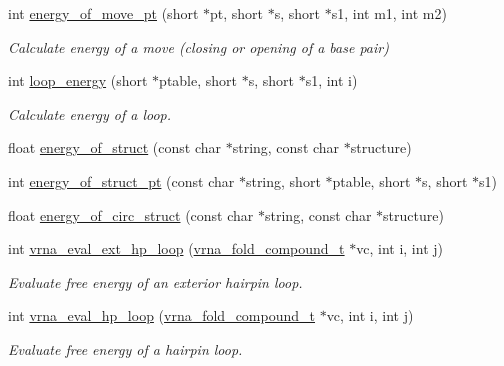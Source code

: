 \begin{DoxyCompactItemize}
int \hyperlink{group__eval_ga49e0ee561be69faf0568213546f6a53f}{energy\-\_\-of\-\_\-move\-\_\-pt} (short $\ast$pt, short $\ast$s, short $\ast$s1, int m1, int m2)
\begin{DoxyCompactList}\small\item\em Calculate energy of a move (closing or opening of a base pair) \end{DoxyCompactList}\item 
int \hyperlink{group__eval_ga507d4fd93f4b398d793ba2402731388d}{loop\-\_\-energy} (short $\ast$ptable, short $\ast$s, short $\ast$s1, int i)
\begin{DoxyCompactList}\small\item\em Calculate energy of a loop. \end{DoxyCompactList}\item 
float \hyperlink{group__eval_gac2b37fea2145c94d925a3f33378ef87b}{energy\-\_\-of\-\_\-struct} (const char $\ast$string, const char $\ast$structure)
\item 
int \hyperlink{group__eval_ga27ce6f68512d43bf1fe14a06c9d76d5c}{energy\-\_\-of\-\_\-struct\-\_\-pt} (const char $\ast$string, short $\ast$ptable, short $\ast$s, short $\ast$s1)
\item 
float \hyperlink{group__eval_ga657222e2758c46bf13b416ef3032e417}{energy\-\_\-of\-\_\-circ\-\_\-struct} (const char $\ast$string, const char $\ast$structure)
\item 
\hypertarget{group__eval_gad3b92453a6b501856eec8fae39f3235d}{int \hyperlink{group__eval_gad3b92453a6b501856eec8fae39f3235d}{vrna\-\_\-eval\-\_\-ext\-\_\-hp\-\_\-loop} (\hyperlink{group__fold__compound_ga1b0cef17fd40466cef5968eaeeff6166}{vrna\-\_\-fold\-\_\-compound\-\_\-t} $\ast$vc, int i, int j)}\label{group__eval_gad3b92453a6b501856eec8fae39f3235d}

\begin{DoxyCompactList}\small\item\em Evaluate free energy of an exterior hairpin loop. \end{DoxyCompactList}\item 
int \hyperlink{group__eval_gab3eb4651dc26dc2b653a57dd340d7e68}{vrna\-\_\-eval\-\_\-hp\-\_\-loop} (\hyperlink{group__fold__compound_ga1b0cef17fd40466cef5968eaeeff6166}{vrna\-\_\-fold\-\_\-compound\-\_\-t} $\ast$vc, int i, int j)
\begin{DoxyCompactList}\small\item\em Evaluate free energy of a hairpin loop. \end{DoxyCompactList}\end{DoxyCompactItemize}
